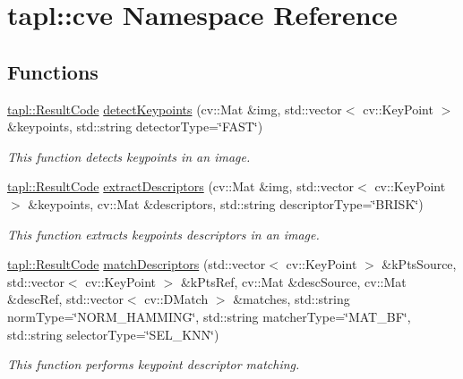 \hypertarget{namespacetapl_1_1cve}{}\section{tapl\+:\+:cve Namespace Reference}
\label{namespacetapl_1_1cve}
\subsection*{Functions}
\begin{DoxyCompactItemize}
\item 
\hyperlink{namespacetapl_a196ce1d5bf399fc26f03797e6a8d03ff}{tapl\+::\+Result\+Code} \hyperlink{namespacetapl_1_1cve_ad74b56dc35c6a902870725543d5df419}{detect\+Keypoints} (cv\+::\+Mat \&img, std\+::vector$<$ cv\+::\+Key\+Point $>$ \&keypoints, std\+::string detector\+Type=\char`\"{}F\+A\+ST\char`\"{})
\begin{DoxyCompactList}\small\item\em This function detects keypoints in an image. \end{DoxyCompactList}\item 
\hyperlink{namespacetapl_a196ce1d5bf399fc26f03797e6a8d03ff}{tapl\+::\+Result\+Code} \hyperlink{namespacetapl_1_1cve_a02712316099758c2b4d0bb0e4e5dc219}{extract\+Descriptors} (cv\+::\+Mat \&img, std\+::vector$<$ cv\+::\+Key\+Point $>$ \&keypoints, cv\+::\+Mat \&descriptors, std\+::string descriptor\+Type=\char`\"{}B\+R\+I\+SK\char`\"{})
\begin{DoxyCompactList}\small\item\em This function extracts keypoints descriptors in an image. \end{DoxyCompactList}\item 
\hyperlink{namespacetapl_a196ce1d5bf399fc26f03797e6a8d03ff}{tapl\+::\+Result\+Code} \hyperlink{namespacetapl_1_1cve_ae2699cc690841efd3b7a3179be1fb889}{match\+Descriptors} (std\+::vector$<$ cv\+::\+Key\+Point $>$ \&k\+Pts\+Source, std\+::vector$<$ cv\+::\+Key\+Point $>$ \&k\+Pts\+Ref, cv\+::\+Mat \&desc\+Source, cv\+::\+Mat \&desc\+Ref, std\+::vector$<$ cv\+::\+D\+Match $>$ \&matches, std\+::string norm\+Type=\char`\"{}N\+O\+R\+M\+\_\+\+H\+A\+M\+M\+I\+NG\char`\"{}, std\+::string matcher\+Type=\char`\"{}M\+A\+T\+\_\+\+BF\char`\"{}, std\+::string selector\+Type=\char`\"{}S\+E\+L\+\_\+\+K\+NN\char`\"{})
\begin{DoxyCompactList}\small\item\em This function performs keypoint descriptor matching. \end{DoxyCompactList}\item 

\end{DoxyCompactItemize}
